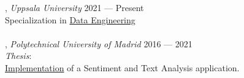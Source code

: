 , \textit{Uppsala University}	\hfill 2021 --- Present \\
Specialization in \href{https://www.uu.se/en/admissions/master/selma/studieplan/?planId=1381&pKod=TDA2M&pInr=DAEN}{Data Engineering} \\

\skills{} \textit{}	\hfill \\

, \textit{Polytechnical University of Madrid} \hfill	2016 --- 2021 \\
\textit{Thesis}: \\
\href{https://oa.upm.es/68107/}{Implementation} of a Sentiment and Text Analysis application.

